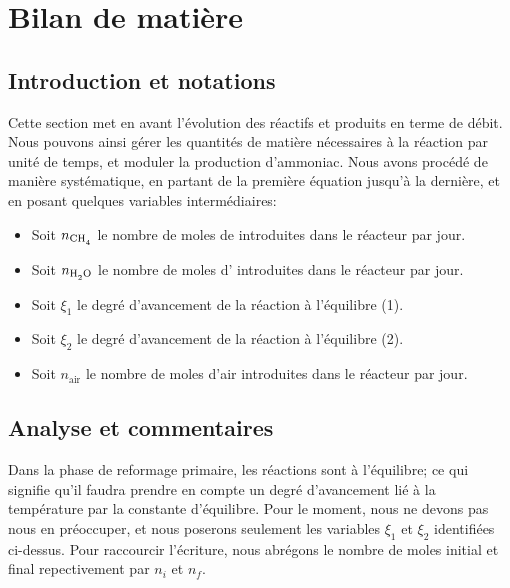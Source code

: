 
\section{Bilan de matière}

\subsection{Introduction et notations}

Cette section met en avant l'évolution des réactifs et produits en terme de débit. 
Nous pouvons ainsi gérer les quantités de matière nécessaires à la réaction par unité de temps, et
moduler la production d'ammoniac. Nous avons procédé de manière systématique, en partant de la première
équation jusqu'à la dernière, et en posant quelques 
variables intermédiaires:

\begin{itemize}
	\item Soit $n_{\ce{CH4}}$ le nombre de moles de  introduites dans le réacteur par jour.
	\item Soit $n_{\ce{H2O}}$ le nombre de moles d' introduites dans le réacteur par jour.
	\item Soit $\xi_1$ le degré d'avancement de la réaction à l'équilibre (1).
	\item Soit $\xi_2$ le degré d'avancement de la réaction à l'équilibre (2).
	\item Soit $n_{\text{air}}$ le nombre de moles d'air introduites dans le réacteur par jour.
\end{itemize}

\subsection{Analyse et commentaires}
Dans la phase de reformage primaire, les réactions sont à l'équilibre; ce qui signifie qu'il faudra prendre en 
compte un degré d'avancement lié à la température par la constante d'équilibre. Pour le moment, nous ne devons pas 
nous en préoccuper, et nous poserons seulement les variables $\xi_1$ et $\xi_2$ identifiées ci-dessus. Pour raccourcir
l'écriture, nous abrégons le nombre de moles initial et final repectivement par $n_i$ et $n_f$.

